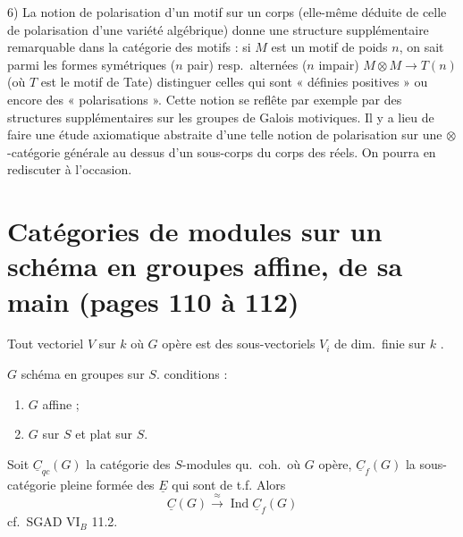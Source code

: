 \documentclass[11pt,a4paper]{article}
\begin{document}
6) La notion de polarisation d'un motif sur un corps (elle-même déduite de
celle de polarisation d'une variété algébrique) donne une structure
supplémentaire remarquable dans la catégorie des motifs : si $M$ est un motif
de poids $n$, on sait parmi les formes symétriques ($n$ pair) resp.\ alternées
($n$ impair) $M \otimes M \to T(n)$ (où $T$ est le motif de Tate) distinguer
celles qui sont « définies positives » ou encore des « polarisations ». Cette
notion se reflête par exemple par des structures supplémentaires sur les
groupes de Galois motiviques. Il y a lieu de faire une étude axiomatique
abstraite d'une telle notion de polarisation sur une $\otimes$-catégorie
générale au dessus d'un sous-corps du corps des réels. On pourra en rediscuter
à l'occasion.

\section*{Catégories de modules sur un schéma en groupes affine, de sa main (pages 110 à 112)}


 

Tout vectoriel $V$ sur $k$ où $G$ opère est \ill{} des sous-vectoriels
$V_{i}$ de dim.\ finie sur $k$ \ill{}.

$G$ schéma en groupes sur $S$. \ill{} conditions :
\begin{enumerate}
\item[a)] $G$ affine ;
\item[b)] $G$  sur $S$ et plat sur $S$.
\end{enumerate}


Soit $\underline{C}_{qc}(G)$ la catégorie des $S$-modules qu.\ coh.\ où $G$
opère, $\underline{C}_{f}(G)$ la sous-catégorie pleine formée des
$\underline{E}$ qui sont de t.f. Alors
\[
\underline{C}(G) \overset{\approx}{\longrightarrow} \operatorname{Ind} \underline{C}_{f}(G)
\]
cf.\ SGAD VI$_{B}$ 11.2.
\end{document}
